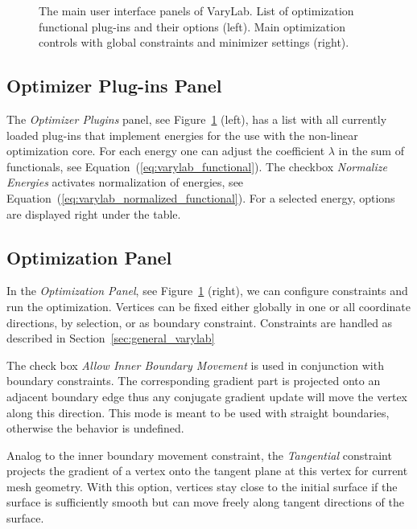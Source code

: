 \documentclass[Thesis.tex]{subfiles}
\begin{document}
\begin{figure}
\begin{center}
\caption{The main user interface panels of {\sc VaryLab}. List of optimization functional plug-ins and their options (left). Main optimization controls with global constraints and minimizer settings (right).}
\label{fig:optimization_interface_varylab}
\end{center}
\end{figure}

\subsection*{Optimizer Plug-ins Panel}
The \emph{Optimizer Plugins} panel, see Figure~\ref{fig:optimization_interface_varylab} (left), has a list with all currently loaded plug-ins that implement energies for the use with the non-linear optimization core. For each energy one can adjust the coefficient $\lambda$ in the sum of functionals, see Equation~(\ref{eq:varylab_functional}).
The checkbox \emph{Normalize Energies} activates normalization of energies, see Equation~(\ref{eq:varylab_normalized_functional}). For a selected energy, options are displayed right under the table.

\subsection*{Optimization Panel}
In the \emph{Optimization Panel}, see Figure~\ref{fig:optimization_interface_varylab} (right), we can configure constraints and run the optimization. Vertices can be fixed either globally in one or all coordinate directions, by selection, or as boundary constraint. Constraints are handled as described in Section~\ref{sec:general_varylab}

The check box \emph{Allow Inner Boundary Movement} is used in conjunction with boundary constraints. The corresponding gradient part is projected onto an adjacent boundary edge thus any conjugate gradient update will move the vertex along this direction. This mode is meant to be used with straight boundaries, otherwise the behavior is undefined.

Analog to the inner boundary movement constraint, the \emph{Tangential}
 constraint projects the gradient of a vertex onto the tangent plane at this vertex for current mesh geometry. With this option, vertices stay close to the initial surface if the surface is sufficiently smooth but can move freely along tangent directions of the surface.
\end{document}
